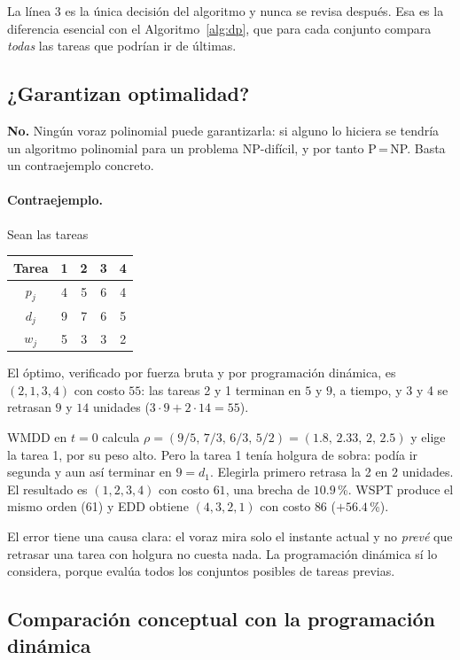 \documentclass[10pt,twocolumn,letterpaper]{article}
\begin{document}
La línea 3 es la única decisión del algoritmo y nunca se revisa después. Esa
es la diferencia esencial con el Algoritmo~\ref{alg:dp}, que para cada conjunto
compara \emph{todas} las tareas que podrían ir de últimas.

\subsection{¿Garantizan optimalidad?}\label{sec:optimalidad}

\textbf{No.} Ningún voraz polinomial puede garantizarla: si alguno lo hiciera
se tendría un algoritmo polinomial para un problema NP-difícil, y por tanto
P\,=\,NP. Basta un contraejemplo concreto.

\paragraph{Contraejemplo.} Sean las tareas
\begin{center}
\begin{tabular}{ccccc}
\toprule
Tarea & 1 & 2 & 3 & 4\\
\midrule
$p_j$ & 4 & 5 & 6 & 4\\
$d_j$ & 9 & 7 & 6 & 5\\
$w_j$ & 5 & 3 & 3 & 2\\
\bottomrule
\end{tabular}
\end{center}
El óptimo, verificado por fuerza bruta y por programación dinámica, es
$(2,1,3,4)$ con costo $55$: las tareas 2 y 1 terminan en $5$ y $9$, a tiempo, y
3 y 4 se retrasan $9$ y $14$ unidades ($3\cdot9+2\cdot14=55$).

WMDD en $t=0$ calcula $\rho=(9/5,\,7/3,\,6/3,\,5/2)=(1.8,\,2.33,\,2,\,2.5)$ y
elige la tarea 1, por su peso alto. Pero la tarea 1 tenía holgura de sobra:
podía ir segunda y aun así terminar en $9=d_1$. Elegirla primero retrasa la 2
en $2$ unidades. El resultado es $(1,2,3,4)$ con costo $61$, una brecha de
$10.9$\,\%. WSPT produce el mismo orden (61) y EDD obtiene $(4,3,2,1)$ con
costo $86$ ($+56.4$\,\%).

El error tiene una causa clara: el voraz mira solo el instante actual y no
\emph{prevé} que retrasar una tarea con holgura no cuesta nada. La
programación dinámica sí lo considera, porque evalúa todos los conjuntos
posibles de tareas previas.

\subsection{Comparación conceptual con la programación dinámica}
\end{document}
